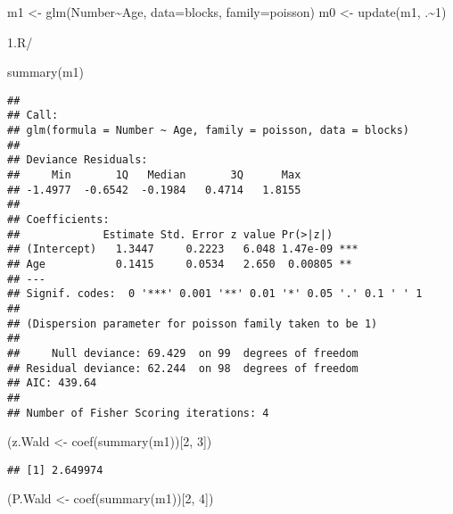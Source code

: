 \documentclass[
]{article}
\newenvironment{Shaded}{\begin{snugshade}}{\end{snugshade}}
\newcommand{\AttributeTok}[1]{\textcolor[rgb]{0.77,0.63,0.00}{#1}}
\newcommand{\DecValTok}[1]{\textcolor[rgb]{0.00,0.00,0.81}{#1}}
\newcommand{\FunctionTok}[1]{\textcolor[rgb]{0.00,0.00,0.00}{#1}}
\newcommand{\NormalTok}[1]{#1}
\newcommand{\OtherTok}[1]{\textcolor[rgb]{0.56,0.35,0.01}{#1}}
\newcommand{\SpecialCharTok}[1]{\textcolor[rgb]{0.00,0.00,0.00}{#1}}
\begin{document}
\begin{Shaded}
\begin{Highlighting}[]
\NormalTok{ m1 }\OtherTok{\textless{}{-}} \FunctionTok{glm}\NormalTok{(Number}\SpecialCharTok{\textasciitilde{}}\NormalTok{Age, }\AttributeTok{data=}\NormalTok{blocks, }\AttributeTok{family=}\NormalTok{poisson)}
\NormalTok{ m0 }\OtherTok{\textless{}{-}} \FunctionTok{update}\NormalTok{(m1, .}\SpecialCharTok{\textasciitilde{}}\DecValTok{1}\NormalTok{)}
\end{Highlighting}
\end{Shaded}

1.R/

\begin{Shaded}
\begin{Highlighting}[]
\FunctionTok{summary}\NormalTok{(m1)}
\end{Highlighting}
\end{Shaded}

\begin{verbatim}
## 
## Call:
## glm(formula = Number ~ Age, family = poisson, data = blocks)
## 
## Deviance Residuals: 
##     Min       1Q   Median       3Q      Max  
## -1.4977  -0.6542  -0.1984   0.4714   1.8155  
## 
## Coefficients:
##             Estimate Std. Error z value Pr(>|z|)    
## (Intercept)   1.3447     0.2223   6.048 1.47e-09 ***
## Age           0.1415     0.0534   2.650  0.00805 ** 
## ---
## Signif. codes:  0 '***' 0.001 '**' 0.01 '*' 0.05 '.' 0.1 ' ' 1
## 
## (Dispersion parameter for poisson family taken to be 1)
## 
##     Null deviance: 69.429  on 99  degrees of freedom
## Residual deviance: 62.244  on 98  degrees of freedom
## AIC: 439.64
## 
## Number of Fisher Scoring iterations: 4
\end{verbatim}

\begin{Shaded}
\begin{Highlighting}[]
\NormalTok{(z.Wald }\OtherTok{\textless{}{-}} \FunctionTok{coef}\NormalTok{(}\FunctionTok{summary}\NormalTok{(m1))[}\DecValTok{2}\NormalTok{, }\DecValTok{3}\NormalTok{])}
\end{Highlighting}
\end{Shaded}

\begin{verbatim}
## [1] 2.649974
\end{verbatim}

\begin{Shaded}
\begin{Highlighting}[]
\NormalTok{ (P.Wald }\OtherTok{\textless{}{-}} \FunctionTok{coef}\NormalTok{(}\FunctionTok{summary}\NormalTok{(m1))[}\DecValTok{2}\NormalTok{, }\DecValTok{4}\NormalTok{])}
\end{Highlighting}
\end{Shaded}
\end{document}
